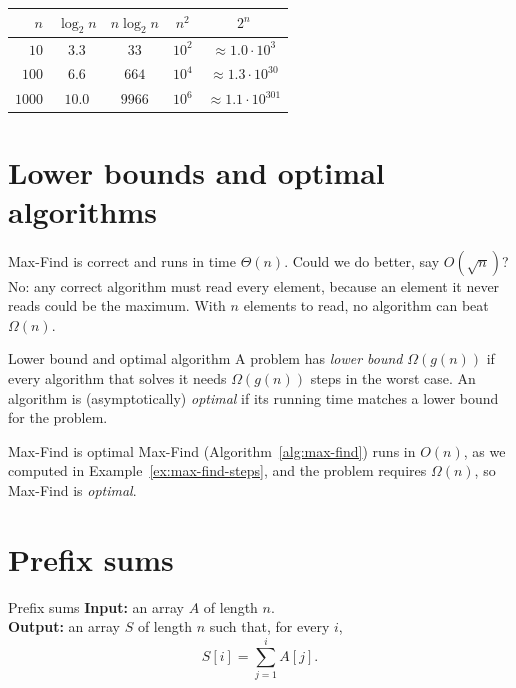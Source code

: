 \documentclass[a4paper,12pt,oneside]{report}
\begin{document}
\begin{center}
\begin{tabular}{rcccc}
  \toprule
  $n$ & $\log_2 n$ & $n\log_2 n$ & $n^2$ & $2^n$\\
  \midrule
  $10$   & $3.3$  & $33$    & $10^2$ & $\approx1.0\cdot10^{3}$\\
  $100$  & $6.6$  & $664$   & $10^4$ & $\approx1.3\cdot10^{30}$\\
  $1000$ & $10.0$ & $9966$  & $10^6$ & $\approx1.1\cdot10^{301}$\\
  \bottomrule
\end{tabular}
\end{center}

\section{Lower bounds and optimal algorithms}

Max-Find is correct and runs in time $\Theta(n)$. Could we do better,
say $O(\sqrt n)$? No: any correct algorithm must read every element,
because an element it never reads could be the maximum. With $n$
elements to read, no algorithm can beat $\Omega(n)$.

\begin{frameddefn}{Lower bound and optimal algorithm}
\label{def:optimal-algorithm}
A problem has \emph{lower bound} $\Omega(g(n))$ if every algorithm
that solves it needs $\Omega(g(n))$ steps in the worst case. An
algorithm is (asymptotically) \emph{optimal} if its running time
matches a lower bound for the problem.
\end{frameddefn}

\begin{framedexample}{Max-Find is optimal}\label{ex:max-find-optimal}
Max-Find (Algorithm~\ref{alg:max-find}) runs in $O(n)$, as we computed
in Example~\ref{ex:max-find-steps}, and the problem requires
$\Omega(n)$, so Max-Find is \emph{optimal}.
\end{framedexample}

\section{Prefix sums}

\begin{framedproblem}{Prefix sums}\label{prob:prefix-sums}
\textbf{Input:} an array $A$ of length $n$.\\
\textbf{Output:} an array $S$ of length $n$ such that, for every $i$,
\[
  S[i]=\sum_{j=1}^{i}A[j].
\]
\end{framedproblem}
\end{document}
